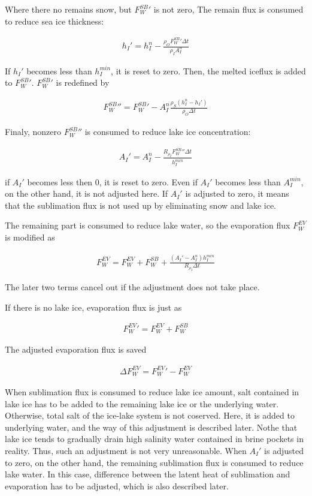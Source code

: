 Where there no remains snow, but \(F_W^{SB}{'}\) is not zero, The remain
flux is consumed to reduce sea ice thickness:

\begin{eqnarray}
    h_I' = h_I^n - \frac{\rho_O F_W^{SB}{'} \Delta t }{\rho_I A_I^n}
\end{eqnarray}

If \(h_I'\) becomes less than \(h_I^{min}\), it is reset to zero. Then,
the melted iceflux is added to \(F_W^{SB}{'}\). \(F_W^{SB}{'}\) is
redefined by

\begin{eqnarray}
    F_W^{SB}{''} = F_W^{SB}{'} - A_I^n \frac{\rho_S (h_I^n-h_I')}{\rho_O\Delta t}
\end{eqnarray}

Finaly, nonzero \(F_W^{SB}{''}\) is consumed to reduce lake ice
concentration:

\begin{eqnarray}
    A_I' = A_I^n - \frac{R_{\rho_I}F_W^{SB}{''} \Delta t }{h_I^{min}}
\end{eqnarray}

if \(A_I'\) becomes less then 0, it is reset to zero. Even if \(A_I'\)
becomes less than \(A_I^{min}\), on the other hand, it is not adjusted
here. If \(A_I'\) is adjusted to zero, it means that the sublimation
flux is not used up by eliminating snow and lake ice.

The remaining part is consumed to reduce lake water, so the evaporation
flux \(F_W^{EV}\) is modified as

\begin{eqnarray}
    F_W^{EV} = F_W^{EV} + F_W^{SB} + \frac{(A_I'-A_I^n) h_I^{min}}{R_{\rho_I}\Delta t}
\end{eqnarray}

The later two terms cancel out if the adjustment does not take place.

If there is no lake ice, evaporation flux is just as

\begin{eqnarray}
    F_W^{EV}{'} = F_W^{EV} + F_W^{SB}
\end{eqnarray}

The adjusted evaporation flux is saved

\begin{eqnarray}
    \Delta F_W^{EV} = F_W^{EV}{'}-  F_W^{EV}
\end{eqnarray}

When sublimation flux is consumed to reduce lake ice amount, salt
contained in lake ice has to be added to the remaining lake ice or the
underlying water. Otherwise, total salt of the ice-lake system is not
coserved. Here, it is added to underlying water, and the way of this
adjustment is described later. Nothe that lake ice tends to gradually
drain high salinity water contained in brine pockets in reality. Thus,
such an adjustment is not very unreasonable. When \(A_I'\) is adjusted
to zero, on the other hand, the remaining sublimation flux is consumed
to reduce lake water. In this case, difference between the latent heat
of sublimation and evaporation has to be adjusted, which is also
described later.

